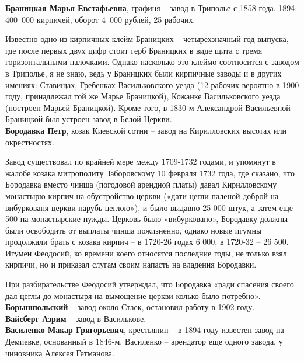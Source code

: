 
\noindent\textbf{Браницкая Марья Евстафьевна}, графиня – завод в Триполье с 1858 года. 1894: \mbox{400 000} кирпичей, оборот \mbox{4 000}  рублей, 25 рабочих.

Известно одно из кирпичных клейм Браницких – четырехзначный год выпуска, где после первых двух цифр стоит герб Браницких в виде щита с тремя горизонтальными палочками. Однако насколько это клеймо соотносится с заводом в Триполье, я не знаю, ведь у Браницких были кирпичные заводы и в других имениях: Ставищах, Гребенках Васильковского уезда (12 рабочих вероятно в 1900 году, принадлежал той же Марье Браницкой), Кожанке Васильковского уезда (построен Марьей Браницкой). Кроме того, в 1830-м Александрой Васильевной Браницкой был устроен завод в Белой Церкви.\\

\noindent\textbf{Бородавка Петр}, козак Киевской сотни – завод на Кирилловских высотах или окрестностях.

Завод существовал по крайней мере между 1709-1732 годами, и упомянут в жалобе козака митрополиту Заборовскому 10 февраля 1732 года, где сказано, что Бородавка вместо чинша (погодовой арендной платы) давал Кирилловскому монастырю кирпич на обустройство церкви («дати цегли паленой доброй на вибуркованя церкви нарубь цеглою»), и было выдавно 25 000 штук, а затем еще 500 на монастырские нужды. 
Церковь было «вибурковано», Бородавку должны были освободить от выплаты чинша пожизненно, однако новые игумны продолжали брать с козака кирпич – в 1720-26 годах 6 000, в 1720-32 – 26 500. Игумен Феодосий, ко времени коего относятся последние годы, не только взял кирпичи, но и приказал слугам своим напасть на владения Бородавки.

При разбирательстве Феодосий утверждал, что Бородавка «ради спасения своего дал цеглы до монастыря на вымощение церкви колько было потребно».\\

\noindent\textbf{Борышпольский} – завод около Стаек, остановил работу в 1902 году.\\

\noindent\textbf{Вайсберг Азрим} – завод в Василькове.\\

\noindent\textbf{Василенко Макар Григорьевич}, крестьянин – в 1894 году известен завод на Демиевке, основанный в 1846-м. Василенко – арендатор еще одного завода, у чиновника Алексея Гетманова.\\

